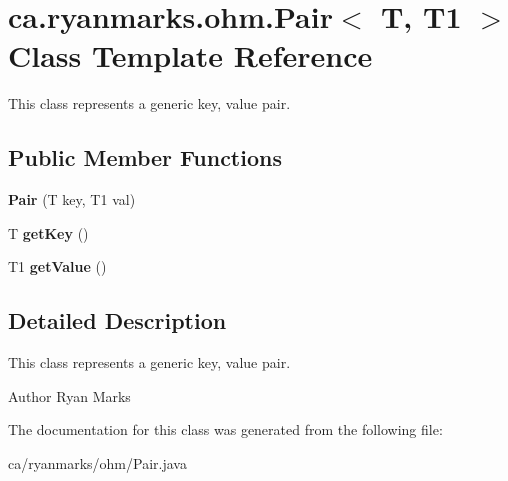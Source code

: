 \hypertarget{classca_1_1ryanmarks_1_1ohm_1_1_pair}{}\section{ca.\+ryanmarks.\+ohm.\+Pair$<$ T, T1 $>$ Class Template Reference}
\label{classca_1_1ryanmarks_1_1ohm_1_1_pair}


This class represents a generic key, value pair.  


\subsection*{Public Member Functions}
\begin{DoxyCompactItemize}
\item 
\hypertarget{classca_1_1ryanmarks_1_1ohm_1_1_pair_ac9da70a05dbdaf125538ef8523d38641}{}\label{classca_1_1ryanmarks_1_1ohm_1_1_pair_ac9da70a05dbdaf125538ef8523d38641} 
{\bfseries Pair} (T key, T1 val)
\item 
\hypertarget{classca_1_1ryanmarks_1_1ohm_1_1_pair_a3ecb02c2223f3d59b995dd51be8044cb}{}\label{classca_1_1ryanmarks_1_1ohm_1_1_pair_a3ecb02c2223f3d59b995dd51be8044cb} 
T {\bfseries get\+Key} ()
\item 
\hypertarget{classca_1_1ryanmarks_1_1ohm_1_1_pair_a1d63c726a56a010afc3e75a77a61205f}{}\label{classca_1_1ryanmarks_1_1ohm_1_1_pair_a1d63c726a56a010afc3e75a77a61205f} 
T1 {\bfseries get\+Value} ()
\end{DoxyCompactItemize}


\subsection{Detailed Description}
This class represents a generic key, value pair. 

\begin{DoxyAuthor}{Author}
Ryan Marks 
\end{DoxyAuthor}


The documentation for this class was generated from the following file\+:\begin{DoxyCompactItemize}
\item 
ca/ryanmarks/ohm/Pair.\+java\end{DoxyCompactItemize}
